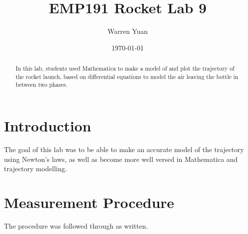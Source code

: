 \documentclass[a4paper,11pt]{article}
\title{\vspace{-2.0cm}EMP191 Rocket Lab 9}
\author{Warren Yuan}
\date{\today}
\begin{document}
    
    \maketitle
    
    \begin{abstract}
     {In this lab, students used Mathematica to make a model of and plot the trajectory of the rocket launch, based on differential equations to model the air leaving the bottle in between two phases.}
    \end{abstract}
    
    \section{Introduction}
    {\quad The goal of this lab was to be able to make an accurate model of the trajectory using Newton's laws, as well as become more well versed in Mathematica and trajectory modelling.}
    
    \section{Measurement Procedure}
    {\quad The procedure was followed through as written.}
    
    
\end{document}
